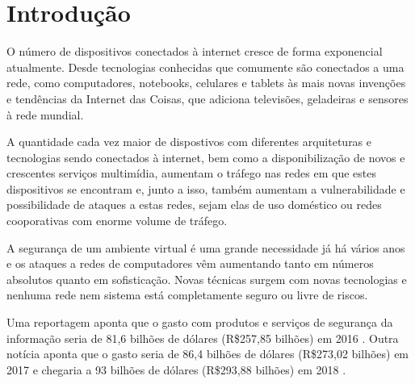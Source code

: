 \documentclass[openright]{normas-utf-tex} %
\begin{document}

\sumario %


%
%
%
%


\chapter{Introdu\c{c}\~ao}

O número de dispositivos conectados à internet cresce de forma exponencial atualmente. Desde tecnologias conhecidas que comumente são conectados a uma rede, como computadores, notebooks, celulares e tablets às mais novas invenções e tendências da Internet das Coisas, que adiciona televisões, geladeiras e sensores à rede mundial.

	  A quantidade cada vez maior de dispostivos com diferentes arquiteturas e tecnologias sendo conectados à internet, bem como a disponibilização de novos e crescentes serviços multimídia, aumentam o tráfego nas redes em que estes dispositivos se encontram e, junto a isso, também aumentam a vulnerabilidade e possibilidade de ataques a estas redes, sejam elas de uso doméstico ou redes cooporativas com enorme volume de tráfego.
	
	A segurança de um ambiente virtual é uma grande necessidade já há vários anos e os ataques a redes de computadores vêm aumentando tanto em números absolutos quanto em sofisticação. Novas técnicas surgem com novas tecnologias e nenhuma rede nem sistema está completamente seguro ou livre de riscos.
	
	Uma reportagem aponta que o gasto com produtos e serviços de segurança da informação seria de 81,6 bilhões de dólares (R\$257,85 bilhões) em 2016 \cite{valor}. Outra notícia aponta que o gasto seria de 86,4 bilhões de dólares (R\$273,02 bilhões) em 2017 e chegaria a 93 bilhões de dólares (R\$293,88 bilhões) em 2018 \cite{forbes}. 
	
\end{document}
